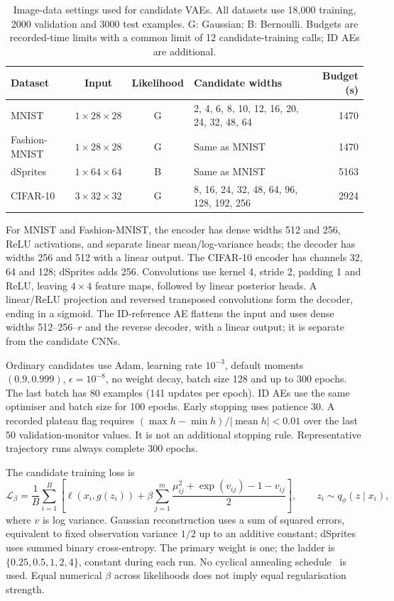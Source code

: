 \begin{table}[H]
\caption{Image-data settings used for candidate VAEs. All datasets use
18,000 training, 2000 validation and 3000 test examples. G: Gaussian;
B: Bernoulli. Budgets are recorded-time limits with a common limit of
12 candidate-training calls; ID AEs are additional.}
\label{tab:data}\small
\begin{tabularx}{\textwidth}{lccXr}\toprule
Dataset & Input & Likelihood & Candidate widths & Budget (s) \\\midrule
MNIST & $1\times28\times28$ & G & 2, 4, 6, 8, 10, 12, 16, 20, 24, 32, 48, 64 & 1470 \\
Fashion-MNIST & $1\times28\times28$ & G & Same as MNIST & 1470 \\
dSprites & $1\times64\times64$ & B & Same as MNIST & 5163 \\
CIFAR-10 & $3\times32\times32$ & G & 8, 16, 24, 32, 48, 64, 96, 128, 192, 256 & 2924 \\
\bottomrule\end{tabularx}
\end{table}

For MNIST and Fashion-MNIST, the encoder has dense widths 512 and 256,
ReLU activations, and separate linear mean/log-variance heads; the decoder
has widths 256 and 512 with a linear output. The CIFAR-10 encoder has
channels 32, 64 and 128; dSprites adds 256. Convolutions use kernel 4,
stride 2, padding 1 and ReLU, leaving $4\times4$ feature maps, followed
by linear posterior heads. A linear/ReLU projection and reversed
transposed convolutions form the decoder, ending in a sigmoid. The
ID-reference AE flattens the input and uses dense widths 512--256--$r$
and the reverse decoder, with a linear output; it is separate from the
candidate CNNs.

Ordinary candidates use Adam, learning rate $10^{-3}$, default moments
$(0.9,0.999)$, $\epsilon=10^{-8}$, no weight decay, batch size 128 and
up to 300 epochs. The last batch has 80 examples (141 updates per epoch).
ID AEs use the same optimiser and batch size for 100 epochs.
Early stopping uses patience 30. A recorded plateau flag requires
$(\max h-\min h)/|\operatorname{mean}h|<0.01$ over the last 50
validation-monitor values. It is not an additional stopping rule.
Representative trajectory runs always complete 300 epochs.

The candidate training loss is
\begin{equation}
 \mathcal L_\beta=\frac1B\sum_{i=1}^B
 \left[\ell(x_i,g(z_i))+\beta\sum_{j=1}^{m}
 \frac{\mu_{ij}^2+\exp(v_{ij})-1-v_{ij}}{2}\right],
 \qquad z_i\sim q_\phi(z\mid x_i),
 \label{eq:loss}
\end{equation}
where $v$ is log variance. Gaussian reconstruction uses a sum of squared
errors, equivalent to fixed observation variance $1/2$ up to an additive
constant; dSprites uses summed binary cross-entropy. The primary weight
is one; the ladder is $\{0.25,0.5,1,2,4\}$, constant during each run.
No cyclical annealing schedule~\cite{fu2019cyclical} is used.
Equal numerical $\beta$ across likelihoods does not imply equal
regularisation strength.

